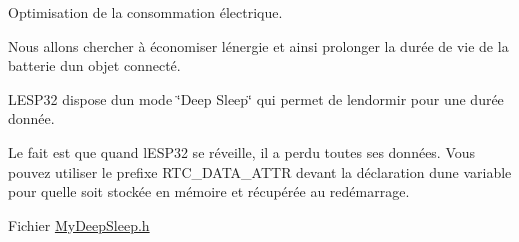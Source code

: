 Optimisation de la consommation électrique.

Nous allons chercher à économiser l\textquotesingle{}énergie et ainsi prolonger la durée de vie de la batterie d\textquotesingle{}un objet connecté.

L\textquotesingle{}ESP32 dispose d\textquotesingle{}un mode \char`\"{}\+Deep Sleep\char`\"{} qui permet de l\textquotesingle{}endormir pour une durée donnée.

Le fait est que quand l\textquotesingle{}ESP32 se réveille, il a perdu toutes ses données. Vous pouvez utiliser le prefixe RTC\+\_\+\+DATA\+\_\+\+ATTR devant la déclaration d\textquotesingle{}une variable pour qu\textquotesingle{}elle soit stockée en mémoire et récupérée au redémarrage.

Fichier \mbox{\hyperlink{_my_deep_sleep_8h}{My\+Deep\+Sleep.\+h}} 